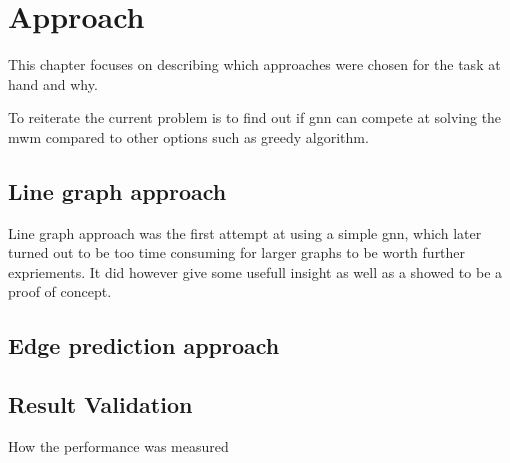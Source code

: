 \chapter{Approach}

This chapter focuses on describing which approaches were chosen for the task at hand and why. 

To reiterate the current problem is to find out if \gls{gnn} can compete at solving the \gls{mwm} compared to other options such as greedy algorithm.

\section{Line graph approach}

Line graph approach was the first attempt at using a simple \gls{gnn}, which later turned out to be too time consuming for larger graphs to be worth further expriements. It did however give some usefull insight as well as a showed to be a proof of concept. 

\section{Edge prediction approach}

\section{Result Validation}


How the performance was measured
